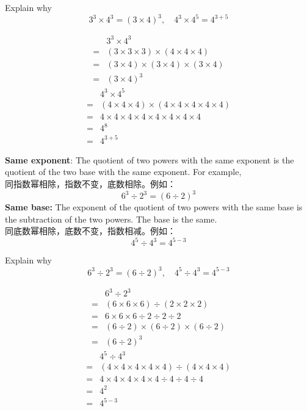 \begin{example}
Explain why 
$$
 3^3\times 4^3 = (3\times 4)^3, \quad 4^3\times 4^5 = 4^{3+5}
$$
\end{example}
\begin{solution}
\begin{align*}
&3^3\times 4^3 \\
=& (3\times 3\times 3) \times (4\times 4\times 4)\\
=& (3\times 4) \times (3\times 4) \times (3\times 4)\\
=& (3\times 4)^3
\end{align*}
\begin{align*}
&4^3\times 4^5\\
=& (4\times 4\times 4) \times (4\times 4\times 4\times 4\times 4)\\
=& 4\times 4\times 4 \times 4\times 4\times 4\times 4\times 4\\
=& 4^8\\
=& 4^{3+5}
\end{align*}
\end{solution}

\begin{newprop}
{\bf Same exponent}: The quotient of two powers with the same exponent is the quotient of the two base with the same exponent. For example, \\
同指数幂相除，指数不变，底数相除。例如：
$$
6^3\div 2^3 = (6\div 2)^3
$$
{\bf Same base:} The exponent of the quotient of two powers with the same base is the subtraction of the two powers. The base is the same.\\
同底数幂相除，底数不变，指数相减。例如：
$$
4^5\div 4^3 = 4^{5-3}
$$
\end{newprop}

\begin{example}
Explain why 
$$
6^3\div 2^3 = (6\div 2)^3, \quad 4^5\div 4^3 = 4^{5-3}
$$
\end{example}
\begin{solution}
\begin{align*}
&6^3\div 2^3  \\
=& (6\times 6\times 6) \div (2\times 2\times 2)\\
=& 6\times 6\times 6 \div 2\div 2\div 2\\
=& (6\div 2) \times (6\div 2) \times (6\div 2)\\
=& (6\div 2)^3
\end{align*}
\begin{align*}
&4^5\div 4^3 \\
=& (4\times 4\times 4\times 4\times 4)\div (4\times 4\times 4)\\
=& 4\times 4\times 4 \times 4\times 4\div 4\div 4\div 4\\
=& 4^2\\
=& 4^{5-3}
\end{align*}
\end{solution}

